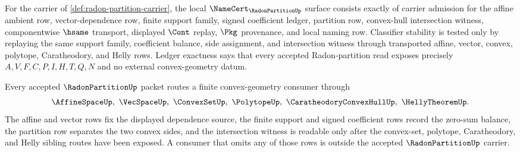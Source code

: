 \begin{theorem}
\label{thm:radon-partition-namecert-obligations}
For the carrier of \autoref{def:radon-partition-carrier}, the local $\NameCert_{\RadonPartitionUp}$ surface consists exactly of carrier admission for the affine ambient row, vector-dependence row, finite support family, signed coefficient ledger, partition row, convex-hull intersection witness, componentwise $\hsame$ transport, displayed $\Cont$ replay, $\Pkg$ provenance, and local naming row. Classifier stability is tested only by replaying the same support family, coefficient balance, side assignment, and intersection witness through transported affine, vector, convex, polytope, Caratheodory, and Helly rows. Ledger exactness says that every accepted Radon-partition read exposes precisely $A,V,F,C,P,I,H,T,Q,N$ and no external convex-geometry datum.
\end{theorem}

\begin{theorem}
\label{thm:radon-partition-affine-dependence-route}
Every accepted $\RadonPartitionUp$ packet routes a finite convex-geometry consumer through
$$
\AffineSpaceUp,\ \VecSpaceUp,\ \ConvexSetUp,\ \PolytopeUp,\ \CaratheodoryConvexHullUp,\ \HellyTheoremUp .
$$
The affine and vector rows fix the displayed dependence source, the finite support and signed coefficient rows record the zero-sum balance, the partition row separates the two convex sides, and the intersection witness is readable only after the convex-set, polytope, Caratheodory, and Helly sibling routes have been exposed. A consumer that omits any of those rows is outside the accepted $\RadonPartitionUp$ carrier.
\end{theorem}


\begin{closurestatus}{\RadonPartitionUp}
  \theoryclosure{\seedClosure}
  \formalstatus{\unformalizedV}
\end{closurestatus}
